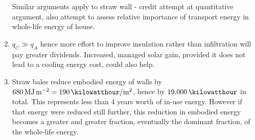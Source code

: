 \documentclass[a4paper,12pt,fleqn]{article}
\begin{document}
\begin{enumerate}[label=\alph*)]
Similar arguments apply to straw wall - credit attempt at quantitative argument, also attempt to assess relative importance of transport energy in whole-life energy of house.
\item $q_C \gg q_A$ hence more effort to improve insulation rather than infiltration will pay greater dividends. Increased, managed solar gain, provided it does not lead to a cooling energy cost, could also help.
\item Straw bales reduce embodied energy of walls by $\SI{680}{\mega\joule\per\metre\squared}=\SI{190}{\kilowatthour\per\metre\squared}$, hence by $\SI{19,000}{\kilowatthour}$ in total. This represents less than 4 years worth of in-use energy. However if that energy were reduced still further, this reduction in embodied energy becomes a greater and greater fraction, eventually the dominant fraction, of the whole-life energy.
\end{enumerate}
\end{document}
